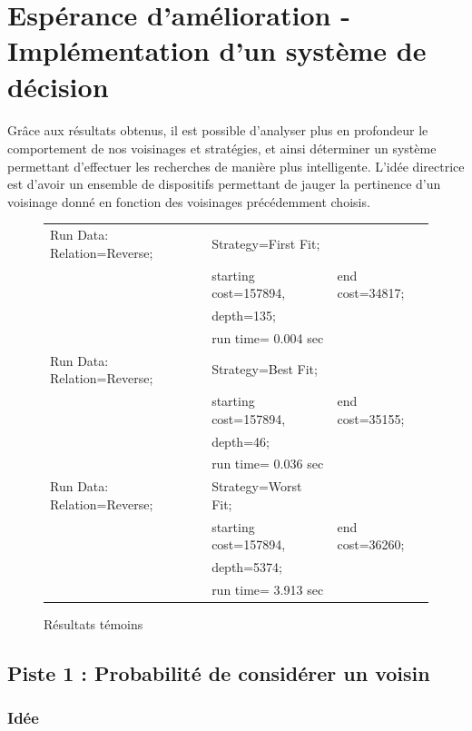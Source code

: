 \documentclass[a4paper,10pt]{report}
\begin{document}

\pagebreak
\section{Espérance d'amélioration - Implémentation d'un système de décision}

\paragraph{}
  Grâce aux résultats obtenus, il est possible d'analyser plus en profondeur le
comportement de nos voisinages et stratégies, et ainsi déterminer un système
permettant d'effectuer les recherches de manière plus intelligente. L'idée
directrice est d'avoir un ensemble de dispositifs permettant de jauger la
pertinence d'un voisinage donné en fonction des voisinages précédemment choisis.


\begin{figure}[h]
  \begin{tabular}{lll}
    Run Data: Relation=Reverse;&
      Strategy=First Fit;\\
      &starting cost=157894,&
      end cost=34817;\\
      &depth=135;\\
      &run time= 0.004 sec\\
    Run Data: Relation=Reverse;&
      Strategy=Best Fit;\\
      &starting cost=157894,&
      end cost=35155;\\
      &depth=46;\\
      &run time= 0.036 sec\\
    Run Data: Relation=Reverse;&
      Strategy=Worst Fit;\\
      &starting cost=157894,&
      end cost=36260;\\
      &depth=5374;\\
      &run time= 3.913 sec\\
  \end{tabular}
  \caption{Résultats témoins}
\end{figure}


\subsection{Piste 1 : Probabilité de considérer un voisin}
\subsubsection{Idée}
\end{document}
